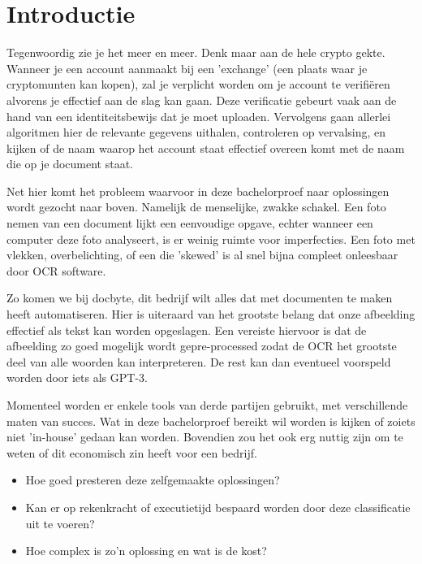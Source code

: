 
\section{Introductie} %
\label{sec:introductie}

Tegenwoordig zie je het meer en meer. Denk maar aan de hele crypto gekte. 
Wanneer je een account aanmaakt bij een 'exchange' (een plaats waar je cryptomunten kan kopen), zal je verplicht worden om je account te verifiëren alvorens je effectief aan de slag kan gaan. Deze verificatie gebeurt vaak aan de hand van een identiteitsbewijs dat je moet uploaden. Vervolgens gaan allerlei algoritmen hier de relevante gegevens uithalen, controleren op vervalsing, en kijken of de naam waarop het account staat effectief overeen komt met de naam die op je document staat.

Net hier komt het probleem waarvoor in deze bachelorproef naar oplossingen wordt gezocht naar boven. Namelijk de menselijke, zwakke schakel. Een foto nemen van een document lijkt een eenvoudige opgave, echter wanneer een computer deze foto analyseert, is er weinig ruimte voor imperfecties. Een foto met vlekken, overbelichting, of een die 'skewed' is al snel bijna compleet onleesbaar door OCR software. 

Zo komen we bij docbyte, dit bedrijf wilt alles dat met documenten te maken heeft automatiseren. Hier is uiteraard van het grootste belang dat onze afbeelding effectief als tekst kan worden opgeslagen. Een vereiste hiervoor is dat de afbeelding zo goed mogelijk wordt gepre-processed zodat de OCR het grootste deel van alle woorden kan interpreteren. De rest kan dan eventueel voorspeld worden door iets als GPT-3.

Momenteel worden er enkele tools van derde partijen gebruikt, met verschillende maten van succes. Wat in deze bachelorproef bereikt wil worden is kijken of zoiets niet 'in-house' gedaan kan worden. Bovendien zou het ook erg nuttig zijn om te weten of dit economisch zin heeft voor een bedrijf.  
\begin{itemize}
	\item  Hoe goed presteren deze zelfgemaakte oplossingen?
	\item  Kan er op rekenkracht of executietijd bespaard worden door deze classificatie uit te voeren?
	\item  Hoe complex is zo'n oplossing en wat is de kost?
\end{itemize}


